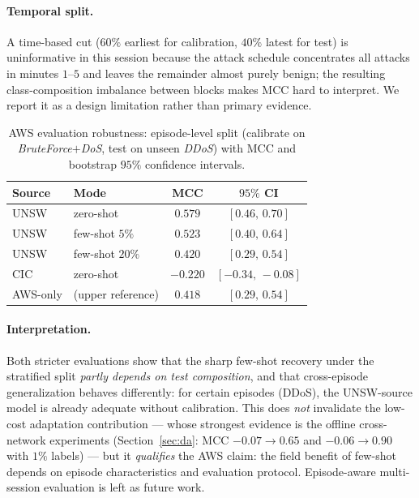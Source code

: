 \documentclass[preprint,12pt,authoryear]{elsarticle}
\begin{document}
\paragraph{Temporal split.} A time-based cut ($60\%$ earliest for calibration,
$40\%$ latest for test) is uninformative in this session because the attack schedule
concentrates all attacks in minutes $1$--$5$ and leaves the remainder almost purely
benign; the resulting class-composition imbalance between blocks makes MCC hard to
interpret. We report it as a design limitation rather than primary evidence.

\begin{table}[h]
\centering
\caption{AWS evaluation robustness: episode-level split (calibrate on
\emph{BruteForce}$+$\emph{DoS}, test on unseen \emph{DDoS}) with MCC and bootstrap
$95\%$ confidence intervals.}
\label{tab:rt-robust}
\small
\begin{tabular}{llcc}
\toprule
Source & Mode & MCC & $95\%$ CI \\
\midrule
UNSW & zero-shot        & $0.579$  & $[0.46,\,0.70]$ \\
UNSW & few-shot $5\%$   & $0.523$  & $[0.40,\,0.64]$ \\
UNSW & few-shot $20\%$  & $0.420$  & $[0.29,\,0.54]$ \\
CIC  & zero-shot        & $-0.220$ & $[-0.34,\,-0.08]$ \\
\midrule
AWS-only & (upper reference) & $0.418$ & $[0.29,\,0.54]$ \\
\bottomrule
\end{tabular}
\end{table}

\paragraph{Interpretation.} Both stricter evaluations show that the sharp few-shot
recovery under the stratified split \emph{partly depends on test composition}, and
that cross-episode generalization behaves differently: for certain episodes (DDoS),
the UNSW-source model is already adequate without calibration. This does \emph{not}
invalidate the low-cost adaptation contribution --- whose strongest evidence is the
offline cross-network experiments (Section~\ref{sec:da}: MCC $-0.07\to0.65$ and
$-0.06\to0.90$ with $1\%$ labels) --- but it \emph{qualifies} the AWS claim: the
field benefit of few-shot depends on episode characteristics and evaluation
protocol. Episode-aware multi-session evaluation is left as future work.
\end{document}
